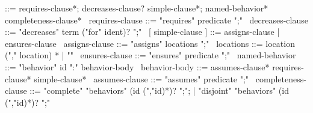 \begin{syntax}
   ::= requires-clause*;
                            decreases-clause? simple-clause*;
                            named-behavior* completeness-clause*
  \
  requires-clause ::= "requires" predicate ";"
  \
  decreases-clause ::= "decreases" term ("for" ident)? ";"
  \
  [ simple-clause ] ::= assigns-clause | ensures-clause
  \
  assigns-clause ::= "assigns" locations ";"
  \
  locations ::= location ("," location) * | "\nothing"
  \
  ensures-clause ::= "ensures" predicate ";"
  \
  named-behavior ::= "behavior" id ":" behavior-body
  \
  behavior-body ::= assumes-clause* requires-clause* simple-clause*
  \
  assumes-clause ::= "assumes" predicate ";"
  \
  completeness-clause ::= "complete" "behaviors" (id (","id)*)? ";";
     | "disjoint" "behaviors" (id (","id)*)? ";"
\end{syntax}
